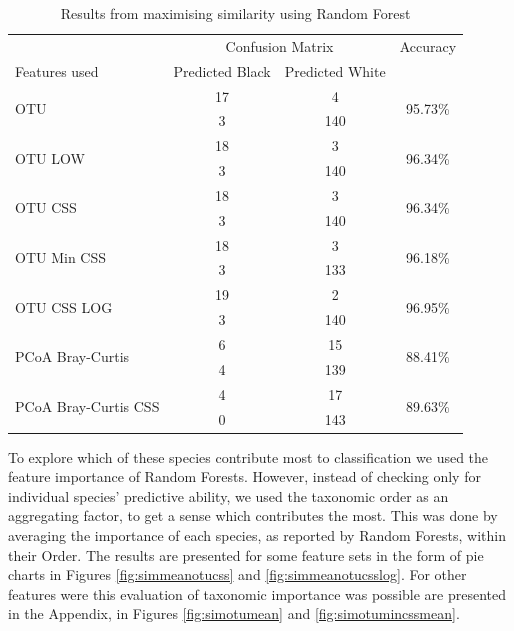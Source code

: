 \begin{table}[h]
	\centering
	\caption{Results from maximising similarity using Random Forest}
	\label{table:rfrsimilarity}
\begin{tabular}{l c  c c}
	\toprule
	&\multicolumn{2}{c}{Confusion Matrix} & Accuracy\\
	Features used & Predicted Black&Predicted White&\\
	
	\midrule
	\multirow{2}{*}{OTU} &17 &4&\multirow{2}{*}{95.73\%}\\
	&	 3&140&\\
	\cmidrule{2-3}
	\multirow{2}{*}{OTU LOW} &18 &3&\multirow{2}{*}{96.34\%}\\
	&	 3&140&\\
	\cmidrule{2-3}
	\multirow{2}{*}{OTU CSS} &18 &3&\multirow{2}{*}{96.34\%}\\
	&	 3&140&\\
	\cmidrule{2-3}
	\multirow{2}{*}{OTU Min CSS}&18 &3&\multirow{2}{*}{96.18\%}\\
	&	 3&133&\\
	\cmidrule{2-3}
	\multirow{2}{*}{OTU CSS LOG} &19 &2&\multirow{2}{*}{96.95\%}\\
	&	 3&140&\\
	\cmidrule{2-3}
	\multirow{2}{*}{PCoA Bray-Curtis} &6 &15&\multirow{2}{*}{88.41\%}\\
	&	 4&139&\\
	\cmidrule{2-3}
	\multirow{2}{*}{PCoA Bray-Curtis CSS} &4 &17&\multirow{2}{*}{89.63\%}\\
	&	 0&143&\\
	\bottomrule
\end{tabular}

\end{table}

To explore which of these species contribute most to classification we used the feature importance of Random Forests. However, instead of checking only for individual species' predictive ability, we used the taxonomic order as an aggregating factor, to get a sense which contributes the most. This was done by averaging the importance of each species, as reported by Random Forests, within their Order. The results are presented for some feature sets in the form of pie charts in Figures \ref{fig:simmeanotucss} and \ref{fig:simmeanotucsslog}. For other features were this evaluation of taxonomic importance was possible are presented in the Appendix, in Figures \ref{fig:simotumean} and \ref{fig:simotumincssmean}. 

